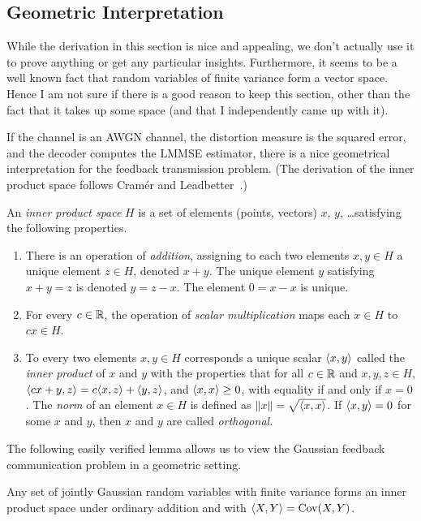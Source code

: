 \subsection{Geometric Interpretation}

\begin{notebox}
  While the derivation in this section is nice and appealing, we don't actually
  use it to prove anything or get any particular insights. Furthermore, it seems
  to be a well known fact that random variables of finite variance form a vector
  space. Hence I am not sure if there is a good reason to keep this section,
  other than the fact that it takes up some space (and that I independently came
  up with it).
\end{notebox}

If the channel is an AWGN channel, the distortion measure is the squared error,
and the decoder computes the LMMSE estimator, there is a nice geometrical
interpretation for the feedback transmission problem. (The derivation of the
inner product space follows Cramér and
Leadbetter~\cite[Section~5.6]{CramerL1967}.)

\begin{definition}
  An \emph{inner product space} $H$ is a set of elements (points, vectors) $x$,
  $y$, \dots satisfying the following properties.
  \begin{enumerate}
    \item There is an operation of \emph{addition}, assigning to each two
      elements $x, y \in H$ a unique element $z \in H$, denoted $x + y$.
      The unique element $y$ satisfying $x + y = z$ is denoted $y = z - x$. The
      element $0 = x-x$ is unique. 
    \item For every $c \in \R$, the operation of \emph{scalar multiplication}
      maps each $x \in H$ to $cx \in H$. 
    \item To every two elements $x,y \in H$ corresponds a unique scalar $\sp x
      y$ called the \emph{inner product} of $x$ and $y$ with the properties that
      for all $c \in \R$ and $x,y, z\in H$, $\sp{cx+y}{z} = c\sp xz + \sp yz$,
      and $\sp xx \ge 0$, with equality if and only if $x = 0$. The
      \emph{norm} of an element $x \in H$ is defined as $\|x\| = \sqrt{\sp xx}$.
      If $\sp xy = 0$ for some $x$ and $y$, then $x$ and $y$ are called
      \emph{orthogonal}.
  \end{enumerate}
\end{definition}

The following easily verified lemma allows us to view the Gaussian feedback
communication problem in a geometric setting.
\begin{lemma}
  \label{lem:rvinprodsp}
  Any set of jointly Gaussian random variables with finite variance forms an
  inner product space under ordinary addition and with $\sp XY = \Cov(X,Y)$. 
\end{lemma}



